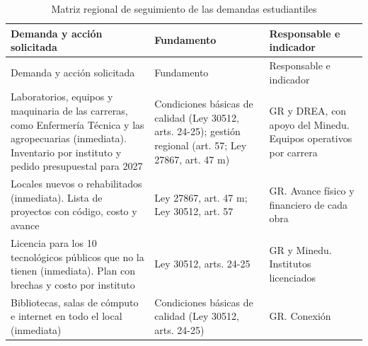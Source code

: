 \documentclass[
  jou,
  floatsintext,
  longtable,
  a4paper,
  nolmodern,
  notxfonts,
  notimes,
  12pt,
  colorlinks=true,linkcolor=blue,citecolor=blue,urlcolor=blue]{apa7}
\newenvironment{twocolumntable}%
{%
\begin{table}[!htbp]%
\onecolumn%
}%
{%
\twocolumn%
\end{table}%
}%
\begin{document}
\begin{twocolumntable}

\begin{longtable}[]{@{}
  >{\raggedright\arraybackslash}p{}
  >{\raggedright\arraybackslash}p{}
  >{\raggedright\arraybackslash}p{}@{}}
\caption{Matriz regional de seguimiento de las demandas
estudiantiles}\label{tbl-demandas}\tabularnewline
\toprule\noalign{}
\begin{minipage}[b]{\linewidth}\raggedright
Demanda y acción solicitada
\end{minipage} & \begin{minipage}[b]{\linewidth}\raggedright
Fundamento
\end{minipage} & \begin{minipage}[b]{\linewidth}\raggedright
Responsable e indicador
\end{minipage} \\
\midrule\noalign{}
\endfirsthead
\toprule\noalign{}
\begin{minipage}[b]{\linewidth}\raggedright
Demanda y acción solicitada
\end{minipage} & \begin{minipage}[b]{\linewidth}\raggedright
Fundamento
\end{minipage} & \begin{minipage}[b]{\linewidth}\raggedright
Responsable e indicador
\end{minipage} \\
\midrule\noalign{}
\endhead
\bottomrule\noalign{}
\endlastfoot
Laboratorios, equipos y maquinaria de las carreras, como Enfermería
Técnica y las agropecuarias (inmediata). Inventario por instituto y
pedido presupuestal para 2027 & Condiciones básicas de calidad (Ley
30512, arts. 24-25); gestión regional (art. 57; Ley 27867, art. 47 m) &
GR y DREA, con apoyo del Minedu. Equipos operativos por carrera \\
Locales nuevos o rehabilitados (inmediata). Lista de proyectos con
código, costo y avance & Ley 27867, art. 47 m; Ley 30512, art. 57 & GR.
Avance físico y financiero de cada obra \\
Licencia para los 10 tecnológicos públicos que no la tienen (inmediata).
Plan con brechas y costo por instituto & Ley 30512, arts. 24-25 & GR y
Minedu. Institutos licenciados \\
Bibliotecas, salas de cómputo e internet en todo el local (inmediata) &
Condiciones básicas de calidad (Ley 30512, arts. 24-25) & GR. Conexión

\end{longtable}
\end{twocolumntable}
\end{document}
